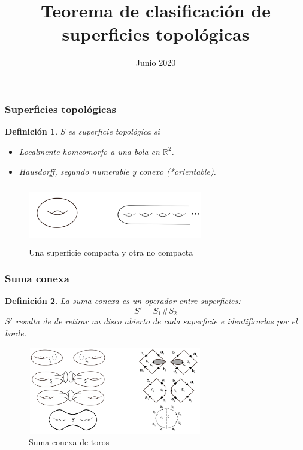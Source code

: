 \documentclass{beamer}
\title[Teorema de clasificación de superficies]{Teorema de clasificación de superficies topológicas}
\author[Rodrigo De Pool]{}
\date[]{Junio 2020}
\newtheorem*{defi}{Definición}
\begin{document}
\frame{\titlepage}
 
\begin{frame}
\frametitle{Superficies topológicas}

\begin{defi}
S es superficie topológica si
\begin{itemize}
    \item Localmente homeomorfo a una bola en $\mathbb{R}^2$.
    \item Hausdorff, segundo numerable y conexo (*orientable).
\end{itemize}
\end{defi}

\begin{figure}[htb]
\begin{center}
\includegraphics[width=3in,height=1in]{imagenes/diapo1.png} 
\caption{Una superficie compacta y otra no compacta}
\end{center}
\end{figure}

\end{frame}

\begin{frame}
\frametitle{Suma conexa}

\begin{defi}
La suma conexa es un operador entre superficies:
\[S' = S_1 \# S_2 \]
$S'$ resulta de de retirar un disco abierto de cada superficie e identificarlas por el borde.
\end{defi}

\begin{figure}[htb]
\begin{center}
\includegraphics[width=3in,height=1.5in]{imagenes/diapo2.png} 
\caption{Suma conexa de toros}
\end{center}
\end{figure}

\end{frame}
\end{document}
